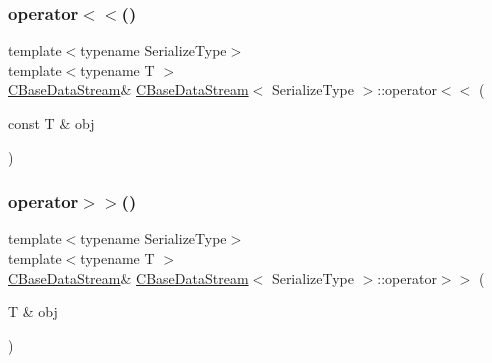 \subsubsection{\texorpdfstring{operator$<$$<$()}{operator<<()}}
{\footnotesize\ttfamily template$<$typename Serialize\+Type$>$ \\
template$<$typename T $>$ \\
\mbox{\hyperlink{class_c_base_data_stream}{C\+Base\+Data\+Stream}}\& \mbox{\hyperlink{class_c_base_data_stream}{C\+Base\+Data\+Stream}}$<$ Serialize\+Type $>$\+::operator$<$$<$ (\begin{DoxyParamCaption}\item[{const T \&}]{obj }\end{DoxyParamCaption})\hspace{0.3cm}{\ttfamily [inline]}}

\mbox{\label{class_c_base_data_stream_aa2733313d5d254eaa7950a480dd6b280}} 
\subsubsection{\texorpdfstring{operator$>$$>$()}{operator>>()}}
{\footnotesize\ttfamily template$<$typename Serialize\+Type$>$ \\
template$<$typename T $>$ \\
\mbox{\hyperlink{class_c_base_data_stream}{C\+Base\+Data\+Stream}}\& \mbox{\hyperlink{class_c_base_data_stream}{C\+Base\+Data\+Stream}}$<$ Serialize\+Type $>$\+::operator$>$$>$ (\begin{DoxyParamCaption}\item[{T \&}]{obj }\end{DoxyParamCaption})\hspace{0.3cm}{\ttfamily [inline]}}

\mbox{\label{class_c_base_data_stream_a0cfc7c327973830d505a6ca59beddae6}} 
